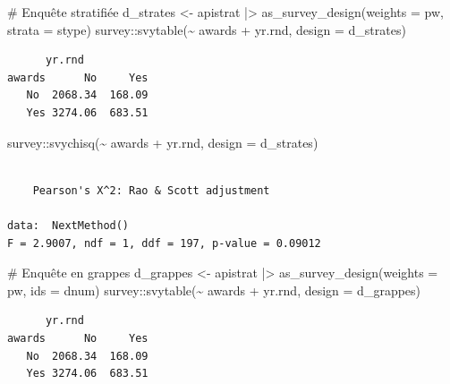 \documentclass[
  letterpaper,
  DIV=11,
  numbers=noendperiod,
  oneside]{scrreprt}
\newenvironment{Shaded}{\begin{snugshade}}{\end{snugshade}}
\newcommand{\AttributeTok}[1]{\textcolor[rgb]{0.40,0.45,0.13}{#1}}
\newcommand{\CommentTok}[1]{\textcolor[rgb]{0.37,0.37,0.37}{#1}}
\newcommand{\FunctionTok}[1]{\textcolor[rgb]{0.28,0.35,0.67}{#1}}
\newcommand{\NormalTok}[1]{\textcolor[rgb]{0.00,0.23,0.31}{#1}}
\newcommand{\OtherTok}[1]{\textcolor[rgb]{0.00,0.23,0.31}{#1}}
\newcommand{\SpecialCharTok}[1]{\textcolor[rgb]{0.37,0.37,0.37}{#1}}
\begin{document}
\begin{Shaded}
\begin{Highlighting}[]
\CommentTok{\# Enquête stratifiée}
\NormalTok{d\_strates }\OtherTok{\textless{}{-}}\NormalTok{ apistrat }\SpecialCharTok{|\textgreater{}} 
  \FunctionTok{as\_survey\_design}\NormalTok{(}\AttributeTok{weights =}\NormalTok{ pw, }\AttributeTok{strata =}\NormalTok{ stype)}
\NormalTok{survey}\SpecialCharTok{::}\FunctionTok{svytable}\NormalTok{(}\SpecialCharTok{\textasciitilde{}}\NormalTok{ awards }\SpecialCharTok{+}\NormalTok{ yr.rnd, }\AttributeTok{design =}\NormalTok{ d\_strates)}
\end{Highlighting}
\end{Shaded}

\begin{verbatim}
      yr.rnd
awards      No     Yes
   No  2068.34  168.09
   Yes 3274.06  683.51
\end{verbatim}

\begin{Shaded}
\begin{Highlighting}[]
\NormalTok{survey}\SpecialCharTok{::}\FunctionTok{svychisq}\NormalTok{(}\SpecialCharTok{\textasciitilde{}}\NormalTok{ awards }\SpecialCharTok{+}\NormalTok{ yr.rnd, }\AttributeTok{design =}\NormalTok{ d\_strates)}
\end{Highlighting}
\end{Shaded}

\begin{verbatim}

    Pearson's X^2: Rao & Scott adjustment

data:  NextMethod()
F = 2.9007, ndf = 1, ddf = 197, p-value = 0.09012
\end{verbatim}

\begin{Shaded}
\begin{Highlighting}[]
\CommentTok{\# Enquête en grappes}
\NormalTok{d\_grappes }\OtherTok{\textless{}{-}}\NormalTok{ apistrat }\SpecialCharTok{|\textgreater{}} 
  \FunctionTok{as\_survey\_design}\NormalTok{(}\AttributeTok{weights =}\NormalTok{ pw, }\AttributeTok{ids =}\NormalTok{ dnum)}
\NormalTok{survey}\SpecialCharTok{::}\FunctionTok{svytable}\NormalTok{(}\SpecialCharTok{\textasciitilde{}}\NormalTok{ awards }\SpecialCharTok{+}\NormalTok{ yr.rnd, }\AttributeTok{design =}\NormalTok{ d\_grappes)}
\end{Highlighting}
\end{Shaded}

\begin{verbatim}
      yr.rnd
awards      No     Yes
   No  2068.34  168.09
   Yes 3274.06  683.51
\end{verbatim}
\end{document}
